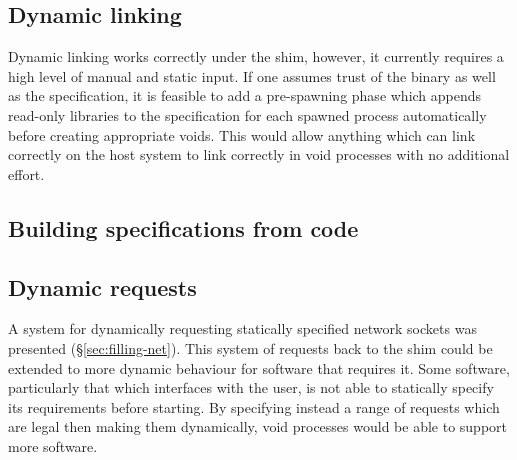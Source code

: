 \documentclass[12pt,a4paper,twoside]{report}
\begin{document}
\subsection{Dynamic linking}
\label{sec:future-work-dynamic-linking}

Dynamic linking works correctly under the shim, however, it currently requires a high level of manual and static input. If one assumes trust of the binary as well as the specification, it is feasible to add a pre-spawning phase which appends read-only libraries to the specification for each spawned process automatically before creating appropriate voids. This would allow anything which can link correctly on the host system to link correctly in void processes with no additional effort.

\subsection{Building specifications from code}
\label{sec:future-work-macros}


\subsection{Dynamic requests}

A system for dynamically requesting statically specified network sockets was presented (§\ref{sec:filling-net}). This system of requests back to the shim could be extended to more dynamic behaviour for software that requires it. Some software, particularly that which interfaces with the user, is not able to statically specify its requirements before starting. By specifying instead a range of requests which are legal then making them dynamically, void processes would be able to support more software.

\label{lastcontentpage} %

 


\appendix

\label{lastpage}
\end{document}
